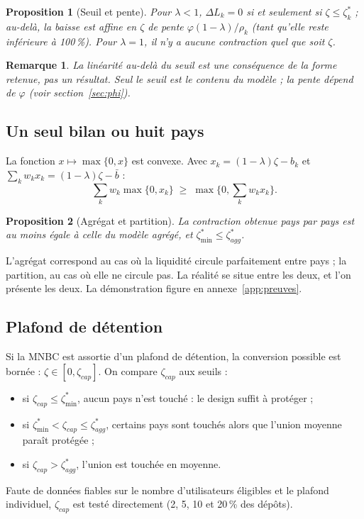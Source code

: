 \documentclass[11pt,a4paper]{article}
\newcommand{\zs}{\zeta^{*}}
\newtheorem{proposition}{Proposition}
\newtheorem{remarque}{Remarque}
\begin{document}
	\begin{proposition}[Seuil et pente]\label{prop:seuil}
		Pour $\lambda<1$, $\Delta L_k=0$ si et seulement si $\zeta\le\zs_k$ ; au-delà, la baisse est affine en $\zeta$ de pente $\varphi(1-\lambda)/\rho_k$ (tant qu'elle reste inférieure à 100\,\%). Pour $\lambda=1$, il n'y a aucune contraction quel que soit $\zeta$.
	\end{proposition}
	
	\begin{remarque}
		La linéarité au-delà du seuil est une conséquence de la forme retenue, pas un résultat. Seul le seuil est le contenu du modèle ; la pente dépend de $\varphi$ (voir section~\ref{sec:phi}).
	\end{remarque}
	
	\subsection{Un seul bilan ou huit pays}
	
	La fonction $x\mapsto\max\{0,x\}$ est convexe. Avec $x_k=(1-\lambda)\zeta-b_k$ et $\sum_k w_k x_k=(1-\lambda)\zeta-\bar b$ :
	\begin{equation}\label{eq:jensen}
		\sum_k w_k\max\{0,x_k\}\;\ge\;\max\Big\{0,\sum_k w_k x_k\Big\}.
	\end{equation}
	
	\begin{proposition}[Agrégat et partition]\label{prop:jensen}
		La contraction obtenue pays par pays est au moins égale à celle du modèle agrégé, et $\zs_{\min}\le\zs_{agg}$.
	\end{proposition}
	
	L'agrégat correspond au cas où la liquidité circule parfaitement entre pays ; la partition, au cas où elle ne circule pas. La réalité se situe entre les deux, et l'on présente les deux. La démonstration figure en annexe~\ref{app:preuves}.
	
	\subsection{Plafond de détention}
	
	Si la MNBC est assortie d'un plafond de détention, la conversion possible est bornée : $\zeta\in[0,\zeta_{cap}]$. On compare $\zeta_{cap}$ aux seuils :
	\begin{itemize}[nosep]
		\item si $\zeta_{cap}\le\zs_{\min}$, aucun pays n'est touché : le design suffit à protéger ;
		\item si $\zs_{\min}<\zeta_{cap}\le\zs_{agg}$, certains pays sont touchés alors que l'union moyenne paraît protégée ;
		\item si $\zeta_{cap}>\zs_{agg}$, l'union est touchée en moyenne.
	\end{itemize}
	Faute de données fiables sur le nombre d'utilisateurs éligibles et le plafond individuel, $\zeta_{cap}$ est testé directement (2, 5, 10 et 20\,\% des dépôts).
	
\end{document}
